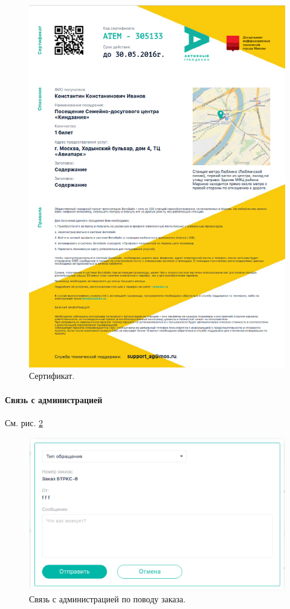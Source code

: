                 \begin{figure}
                    \center
                    \includegraphics[width=120mm]{04_auth_funcs/figures/13.eps}
                    \caption{Сертификат.}
                    \label{fig:auth_order_cert}
                \end{figure}
 
                \paragraph{Связь с администрацией}
                См. рис. \ref{fig:auth_order_feedback}

                \begin{figure}
                    \center
                    \includegraphics[width=120mm]{04_auth_funcs/figures/11.eps}
                    \caption{Связь с администрацией по поводу заказа.}
                    \label{fig:auth_order_feedback}
                \end{figure}

